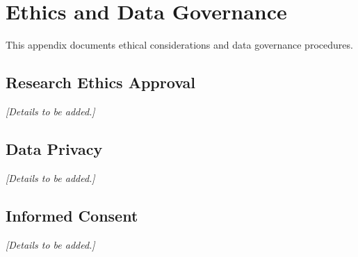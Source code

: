 \documentclass[../main.tex]{subfiles}
\begin{document}
\chapter{Ethics and Data Governance}

This appendix documents ethical considerations and data governance procedures.

\section{Research Ethics Approval}

\textit{[Details to be added.]}

\section{Data Privacy}

\textit{[Details to be added.]}

\section{Informed Consent}

\textit{[Details to be added.]}
\end{document}
